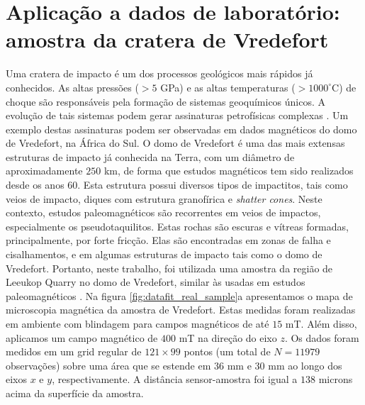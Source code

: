 \chapter{Aplicação a dados de laboratório: amostra da cratera de Vredefort}
\label{sec:lab_application}

Uma cratera de impacto é um dos processos geológicos mais rápidos já conhecidos. As altas pressões ($> 5$ GPa) e as altas temperaturas ($> 1000^\circ$C) de choque são responsáveis pela formação de sistemas geoquímicos únicos. A evolução de tais sistemas podem gerar assinaturas petrofísicas complexas \citep{pilkington_grieve_1992,pilkington_hildebrand_2003,yokoyama_etal_2015}. Um exemplo destas assinaturas podem ser observadas em dados magnéticos do domo de Vredefort, na África do Sul. O domo de Vredefort é uma das mais extensas estruturas de impacto já conhecida na Terra, com um diâmetro de aproximadamente $250$ km, de forma que estudos magnéticos tem sido realizados desde os anos 60. Esta estrutura possui diversos tipos de impactitos, tais como veios de impacto, diques com estrutura granofírica e \textit{shatter cones}. Neste contexto, estudos paleomagnéticos são recorrentes em veios de impactos, especialmente os pseudotaquilitos. Estas rochas são escuras e vítreas formadas, principalmente, por forte fricção. Elas são encontradas em zonas de falha e cisalhamentos, e em algumas estruturas de impacto tais como o domo de Vredefort. Portanto, neste trabalho, foi utilizada uma amostra da região de Leeukop Quarry no domo de Vredefort, similar às usadas em estudos paleomagnéticos \citep{passchier_1982,lana_etal_2003,dressler_reimold_2004,carporzen_etal_2005}. Na figura \ref{fig:datafit_real_sample}a apresentamos o mapa de microscopia magnética da amostra de Vredefort. Estas medidas foram realizadas em ambiente com blindagem para campos magnéticos de até $15$ mT. Além disso, aplicamos um campo magnético de $400$ mT na direção do eixo $z$. Os dados foram medidos em um grid regular de $121 \times 99$ pontos (um total de $N=11979$ observações) sobre uma área que se estende em $36$ mm e $30$ mm ao longo dos eixos $x$ e $y$, respectivamente. A distância sensor-amostra foi igual a $138$ microns acima da superfície da amostra. 


